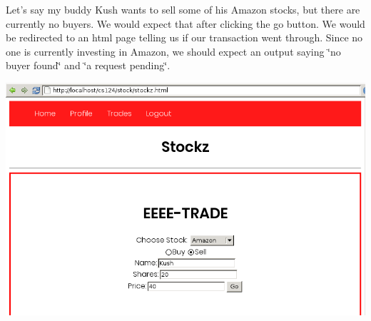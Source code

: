Let's say my buddy Kush wants to sell some of his Amazon stocks, but there are currently no buyers. We would expect that after clicking the go button. We would be redirected to an html page telling us if our transaction went through. Since no one is currently investing in Amazon, we should expect an output saying \char`\"{}no buyer found\char`\"{} and \char`\"{}a request pending\char`\"{}.

 
\includegraphics[scale=0.5]{../test2.png}
 